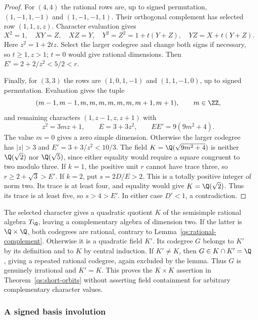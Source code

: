 \begin{proof}
For $(4,4)$ the rational rows are, up to signed permutation,
$(1,-1,1,-1)$ and $(1,-1,-1,1)$. Their orthogonal complement has
selected row $(1,1,z,z)$. Character evaluation gives
\[
 X^2=1,\quad XY=Z,\quad XZ=Y,\quad
 Y^2=Z^2=1+t(Y+Z),\quad YZ=X+t(Y+Z).
\]
Here $z^2=1+2tz$. Select the larger codegree and change both signs
if necessary, so $t\ge1,z>1$; $t=0$ would give rational dimensions.
Then $E'=2+2/z^2<5/2<r$.

Finally, for $(3,3)$ the rows are
$(1,0,1,-1)$ and $(1,1,-1,0)$, up to signed permutation.
Evaluation gives the tuple
\[
(m-1,m-1,m,m,m,m,m,m,m+1,m+1),\qquad m\in\ZZ,
\]
and remaining characters $(1,z-1,z,z+1)$ with
\begin{equation}\label{quad:eq:rational-three-normal-form}
 z^2=3mz+1,\qquad E=3+3z^2,\qquad EE'=9(9m^2+4).
\end{equation}
The value $m=0$ gives a zero simple dimension. Otherwise the larger
codegree has $|z|>3$ and $E'=3+3/z^2<10/3$.
The field $K=\Q(\sqrt{9m^2+4})$ is neither
$\Q(\sqrt2)$ nor $\Q(\sqrt5)$, since either equality
would require a square congruent to two modulo three.
If $k=1$, the positive unit $r$ cannot have trace three, so
$r\ge2+\sqrt3>E'$. If $k=2$, put $s=2D/E>2$.
This is a totally positive integer of norm two. Its trace is at least
four, and equality would give $K=\Q(\sqrt2)$. Thus its trace
is at least five, so $s>4>E'$. In either case $D'<1$, a contradiction.
\end{proof}

The selected character gives a quadratic quotient $K$ of the semisimple
rational algebra $T_{\Q}$, leaving a complementary algebra of
dimension two. If the latter is $\Q\times\Q$, both codegrees
are rational, contrary to Lemma~\ref{qs:rational-complement}. Otherwise
it is a quadratic field $K'$. Its codegree $G$ belongs to $K'$ by its
definition and to $K$ by central induction. If $K'\ne K$, then
$G\in K\cap K'=\Q$, giving a repeated rational codegree,
again excluded by the lemma. Thus $G$ is genuinely irrational and
$K'=K$. This proves the $K\times K$ assertion in
Theorem~\ref{qs:short-orbits} without asserting field containment
for arbitrary complementary character values.

\subsubsection{A signed basis involution}


